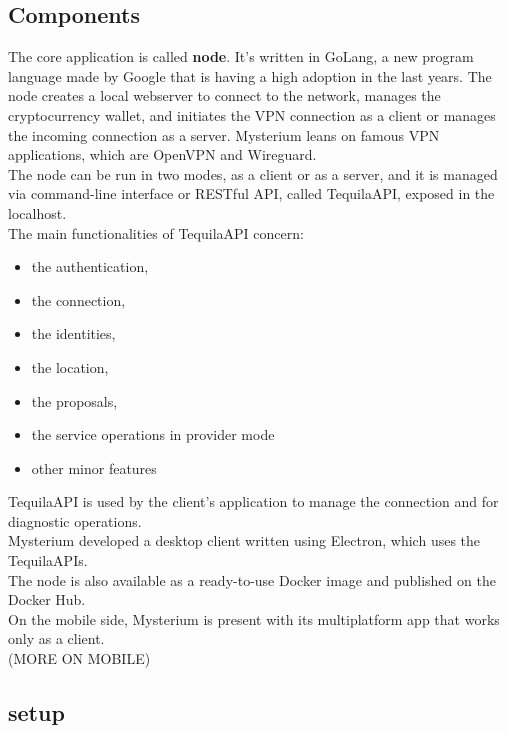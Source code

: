 \documentclass[]{article}
\begin{document}
	\subsection{Components}

	The core application is called \textbf{node}. It's written in GoLang, a new program language made by Google that is having a high adoption in the last years. The node creates a local webserver to connect to the network, manages the cryptocurrency wallet, and initiates the VPN connection as a client or manages the incoming connection as a server. Mysterium leans on famous VPN applications, which are OpenVPN and Wireguard.\\
	The node can be run in two modes, as a client or as a server, and it is managed via command-line interface or RESTful API, called TequilaAPI, exposed in the localhost.\\
	The main functionalities of TequilaAPI concern:
	\begin{itemize}
		\item the authentication,
		\item the connection,
		\item the identities,
		\item the location,
		\item the proposals,
		\item the service operations in provider mode
		\item other minor features
	\end{itemize}
		
	TequilaAPI is used by the client's application to manage the connection and for diagnostic operations.\\
	Mysterium developed a desktop client written using Electron, which uses the TequilaAPIs.\\
	The node is also available as a ready-to-use Docker image and published on the Docker Hub.\\
	On the mobile side, Mysterium is present with its multiplatform app that works only as a client.\\
	(MORE ON MOBILE)

	\subsection{setup}
\end{document}
